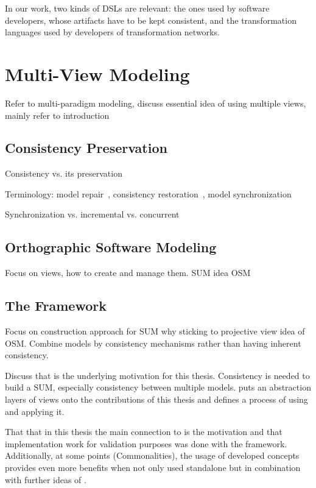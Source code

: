 In our work, two kinds of DSLs are relevant: the ones used by software developers, whose artifacts have to be kept consistent, and the transformation languages used by developers of transformation networks.


\section{Multi-View Modeling}
\label{chap:foundations:multiview}

Refer to multi-paradigm modeling, discuss essential idea of using multiple views, mainly refer to introduction

\subsection{Consistency Preservation}

Consistency vs. its preservation

Terminology: model repair~\cite{macedo2017ModelRepairClassification-TSE}, consistency restoration~\cite{stevens2010sosym, kramer2017a}, model synchronization~\cite{diskin2016Taxonomy-JSS}

Synchronization vs. incremental vs. concurrent

\subsection{Orthographic Software Modeling}
\label{chap:foundations:multiview:osm}
Focus on views, how to create and manage them. SUM idea
\gls{OSM}


\subsection{The \vitruv Framework}
\label{chap:foundations:multiview:vitruv}
Focus on construction approach for SUM why sticking to projective view idea of \gls{OSM}. 
Combine models by consistency mechanisms rather than having inherent consistency.

Discuss that \vitruv is the underlying motivation for this thesis. Consistency is needed to build a SUM, especially consistency between multiple models.
\vitruv puts an abstraction layers of views onto the contributions of this thesis and defines a process of using and applying it. 

That that in this thesis the main connection to \vitruv is the motivation and that implementation work for validation purposes was done with the \vitruv framework.
Additionally, at some points (Commonalities), the usage of developed concepts provides even more benefits when not only used standalone but in combination with further ideas of \vitruv.

